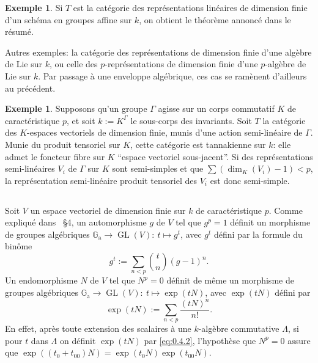 \documentclass[11pt,a4paper]{article}
\theoremstyle{plain}
\theoremstyle{definition}
\newtheorem{example}[theorem]{Exemple}
\DeclareMathOperator{\GL}{GL}
\newcommand{\Ga}{\mathbb{G}_\mathrm{a}}
\begin{document}
\begin{example}\label{ex:0.2}
Si $T$ est la cat\'egorie des repr\'esentations lin\'eaires de dimension finie d'un sch\'ema en groupes affine sur $k$, on obtient le th\'eor\`eme annonc\'e dans le r\'esum\'e.

Autres exemples: la cat\'egorie des repr\'esentations de dimension finie d'une alg\`ebre de Lie sur $k$, ou celle des $p$-repr\'esentations de dimension finie d'une $p$-alg\`ebre de Lie sur $k$. Par passage \`a une enveloppe alg\'ebrique, ces cas se ram\`enent d'ailleurs au pr\'ec\'edent.
\end{example}

\begin{example}\label{ex:0.3}
Supposons qu'un groupe $\Gamma$ agisse sur un corps commutatif $K$ de caract\'eristique $p$, et soit $k := K^\Gamma$ le sous-corps des invariants. Soit $T$ la cat\'egorie des $K$-espaces vectoriels de dimension finie, munis d'une action semi-lin\'eaire de $\Gamma$. Munie du produit tensoriel sur $K$, cette cat\'egorie est tannakienne sur $k$: elle admet le foncteur fibre sur $K$ ``espace vectoriel sous-jacent''. Si des repr\'esentations semi-lin\'eaires $V_i$ de $\Gamma$ sur $K$ sont semi-simples et que $\sum (\dim_K(V_i) - 1) < p$, la repr\'esentation semi-lin\'eaire produit tensoriel des $V_i$ est donc semi-simple.
\end{example}

\subsection{}
Soit $V$ un espace vectoriel de dimension finie sur $k$ de caract\'eristique $p$. Comme expliqu\'e dans \cite{Serre1994}~\S4, un automorphisme $g$ de $V$ tel que $g^p = 1$ d\'efinit un morphisme de groupes alg\'ebriques $\Ga \to \GL(V):\ t \mapsto g^t$, avec $g^t$ d\'efini par la formule du bin\^ome
\begin{equation}\label{eq:0.4.1}
g^t := \sum_{n < p} \binom{t}{n} (g - 1)^n.
\end{equation}
Un endomorphisme $N$ de $V$ tel que $N^p = 0$ d\'efinit de m\^eme un morphisme de groupes alg\'ebriques $\Ga \to \GL(V):\ t \mapsto \exp(tN)$, avec $\exp(tN)$ d\'efini par
\begin{equation}\label{eq:0.4.2}
\exp(tN) := \sum_{n < p} \frac{(tN)^n}{n!}.
\end{equation}
En effet, apr\`es toute extension des scalaires \`a une $k$-alg\`ebre commutative $\Lambda$, si pour $t$ dans $\Lambda$ on d\'efinit $\exp(tN)$ par \eqref{eq:0.4.2}, l'hypoth\`ese que $N^p = 0$ assure que $\exp((t_0 + t_{00})N) = \exp(t_0 N) \exp(t_{00} N)$.
\end{document}
